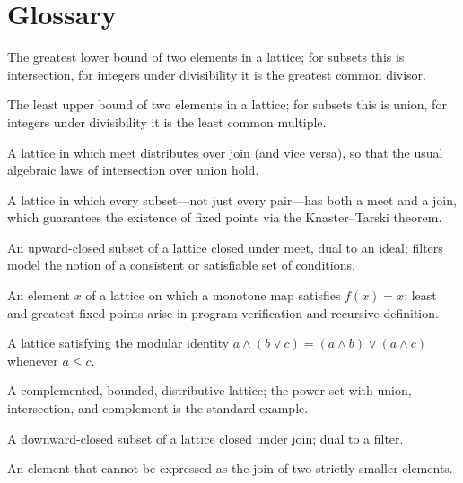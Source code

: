 \section*{Glossary}
\begin{description}[leftmargin=*,style=nextline,itemsep=0.3em]
\item[\textbf{Meet.}] The greatest lower bound of two elements in a lattice; for subsets this is intersection, for integers under divisibility it is the greatest common divisor.
\item[\textbf{Join.}] The least upper bound of two elements in a lattice; for subsets this is union, for integers under divisibility it is the least common multiple.
\item[\textbf{Distributive lattice.}] A lattice in which meet distributes over join (and vice versa), so that the usual algebraic laws of intersection over union hold.
\item[\textbf{Complete lattice.}] A lattice in which every subset---not just every pair---has both a meet and a join, which guarantees the existence of fixed points via the Knaster--Tarski theorem.
\item[\textbf{Filter.}] An upward-closed subset of a lattice closed under meet, dual to an ideal; filters model the notion of a consistent or satisfiable set of conditions.
\item[\textbf{Fixed point.}] An element $x$ of a lattice on which a monotone map satisfies $f(x)=x$; least and greatest fixed points arise in program verification and recursive definition.
\item[\textbf{Modular lattice.}] A lattice satisfying the modular identity $a\wedge(b\vee c)=(a\wedge b)\vee(a\wedge c)$ whenever $a\leq c$.
\item[\textbf{Boolean lattice.}] A complemented, bounded, distributive lattice; the power set with union, intersection, and complement is the standard example.
\item[\textbf{Ideal.}] A downward-closed subset of a lattice closed under join; dual to a filter.
\item[\textbf{Join-irreducible element.}] An element that cannot be expressed as the join of two strictly smaller elements.
\end{description}

